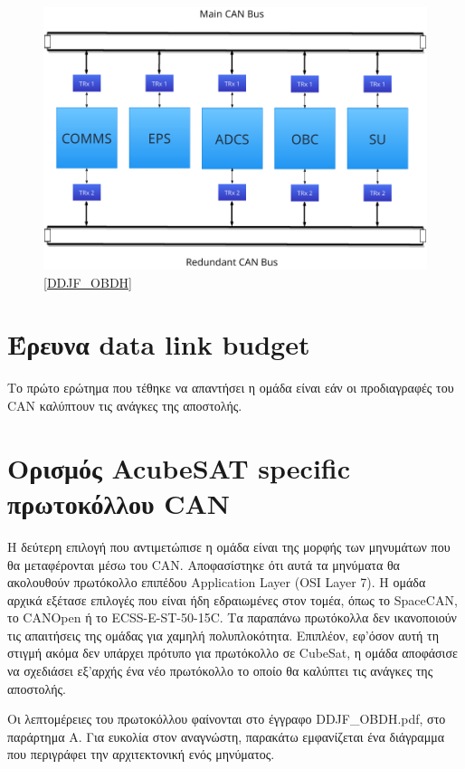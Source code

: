 \documentclass[a4paper,nobib,justified]{tufte-book}
\begin{document}
\begin{figure}[h]
	\includegraphics{media/diagrams/subsystems-on-buses.pdf}
	\label{fig:dual-buses}
	\ref{DDJF_OBDH}
\end{figure}


\section{Έρευνα data link budget}
Το πρώτο ερώτημα που τέθηκε να απαντήσει η ομάδα είναι εάν οι προδιαγραφές του CAN καλύπτουν τις ανάγκες της αποστολής.

\section{Ορισμός AcubeSAT specific πρωτοκόλλου CAN}
Η δεύτερη επιλογή που αντιμετώπισε η ομάδα είναι της μορφής των μηνυμάτων που θα μεταφέρονται μέσω του CAN. Αποφασίστηκε ότι αυτά τα μηνύματα θα ακολουθούν πρωτόκολλο επιπέδου Application Layer (OSI Layer 7). Η ομάδα αρχικά εξέτασε επιλογές που είναι ήδη εδραιωμένες στον τομέα, όπως το SpaceCAN, το CANOpen ή το ECSS-E-ST-50-15C. Τα παραπάνω πρωτόκολλα δεν ικανοποιούν τις απαιτήσεις της ομάδας για χαμηλή πολυπλοκότητα. Επιπλέον, εφ'όσον αυτή τη στιγμή ακόμα δεν υπάρχει πρότυπο για πρωτόκολλο σε CubeSat, η ομάδα αποφάσισε να σχεδιάσει εξ'αρχής ένα νέο πρωτόκολλο το οποίο θα καλύπτει τις ανάγκες της αποστολής.

Οι λεπτομέρειες του πρωτοκόλλου φαίνονται στο έγγραφο DDJF\_OBDH.pdf, στο παράρτημα Α. Για ευκολία στον αναγνώστη, παρακάτω εμφανίζεται ένα διάγραμμα που περιγράφει την αρχιτεκτονική ενός μηνύματος.
\end{document}
